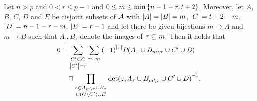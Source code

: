 \begin{lemma}
    Let $n>p$ and $0< r\leq p-1$ and $0\leq m\leq \min\set{n-1-r,t+2}$. Moreover, let $A$, $B$, $C$, $D$ and $E$ be disjoint subsets of $\mathcal{A}$ with $\left\vert{A}\right\vert=\left\vert{B}\right\vert=m$, $\left\vert{C}\right\vert=t+2-m$, $\left\vert{D}\right\vert=n-1-r-m$, $\left\vert{E}\right\vert=r-1$ and let there be given bijections $m\to A$ and $m\to B$ such that $A_\tau, B_\tau$ denote the images of $\tau\subseteq m$. Then it holds that
    \begin{align*}
        0 & = \sum_{\substack{C'\setleq C                                                                       \\
                \card{C'}=r}}
        {\sum_{\tau\setleq m}{{(-1)}^{\card{\tau}}P(A_{\tau}\setjoin B_{m\setminus\tau}\setjoin C'\setjoin D)}} \\
          & \quad\setprod\prod_{\substack{z\in A_{m\setminus\tau}\setjoin B_{\tau}                                  \\
                  \setjoin(C\setminus C')\setjoin E}}
          {{\det(z,A_{\tau}\setjoin B_{m\setminus\tau}\setjoin C'\setjoin D)}^{-1}}.
\end{align*}
\end{lemma}
